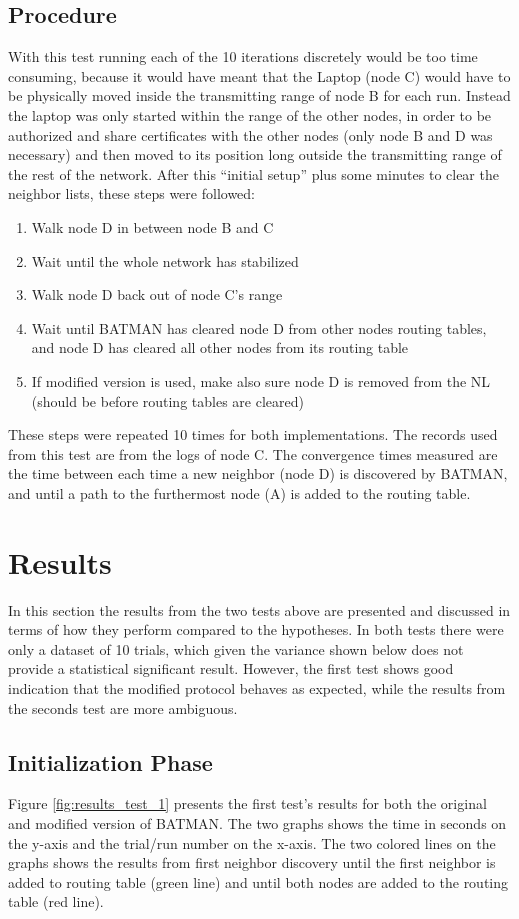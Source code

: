 \subsection{Procedure}
With this test running each of the 10 iterations discretely would be too time
consuming, because it would have meant that the Laptop (node C) would have to be
physically moved inside the transmitting range of node B for each run. Instead
the laptop was only started within the range of the other nodes, in order to be
authorized and share certificates with the other nodes (only node B and D was
necessary) and then moved to its position long outside the transmitting range of
the rest of the network. After this ``initial setup'' plus some minutes to
clear the neighbor lists, these steps were followed:
\begin{enumerate}
  \item Walk node D in between node B and C
  \item Wait until the whole network has stabilized
  \item Walk node D back out of node C's range
  \item Wait until BATMAN has cleared node D from other nodes routing tables,
  and node D has cleared all other nodes from its routing table
  \item If modified version is used, make also sure node D is removed from the
  \ac{NL} (should be before routing tables are cleared)
\end{enumerate}
These steps were repeated 10 times for both implementations. The records used
from this test are from the logs of node C. The convergence times measured
are the time between each time a new neighbor (node D) is discovered by BATMAN,
and until a path to the furthermost node (A) is added to the routing table.


\section{Results}
In this section the results from the two tests above are presented and discussed
in terms of how they perform compared to the hypotheses. In both tests there
were only a dataset of 10 trials, which given the variance shown below does not
provide a statistical significant result. However, the first test shows good
indication that the modified protocol behaves as expected, while the results
from the seconds test are more ambiguous.

\subsection{Initialization Phase}
Figure \ref{fig:results_test_1} presents the first test's results for both the
original and modified version of BATMAN. The two graphs shows the time in
seconds on the y-axis and the trial/run number on the x-axis. The two colored
lines on the graphs shows the results from first neighbor discovery until the
first neighbor is added to routing table (green line) and until both nodes are
added to the routing table (red line).

